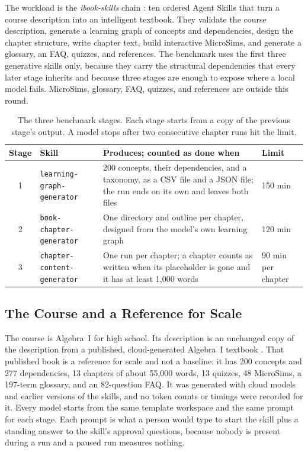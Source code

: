 \documentclass[11pt]{article}
\begin{document}
The workload is the \textit{ibook-skills} chain \cite{ibookskills}: ten ordered Agent Skills that turn a course description into an intelligent textbook. They validate the course description, generate a learning graph of concepts and dependencies, design the chapter structure, write chapter text, build interactive MicroSims, and generate a glossary, an FAQ, quizzes, and references. The benchmark uses the first three generative skills only, because they carry the structural dependencies that every later stage inherits and because three stages are enough to expose where a local model fails. MicroSims, glossary, FAQ, quizzes, and references are outside this round.

\begin{table}[htbp]
\centering
\small
\begin{tabularx}{\textwidth}{@{}clXl@{}}
\toprule
\textbf{Stage} & \textbf{Skill} & \textbf{Produces; counted as done when} & \textbf{Limit} \\
\midrule
1 & \texttt{learning-graph-generator} & 200 concepts, their dependencies, and a taxonomy, as a CSV file and a JSON file; the run ends on its own and leaves both files & 150 min \\
2 & \texttt{book-chapter-generator} & One directory and outline per chapter, designed from the model's own learning graph & 120 min \\
3 & \texttt{chapter-content-generator} & One run per chapter; a chapter counts as written when its placeholder is gone and it has at least 1,000 words & 90 min per chapter \\
\bottomrule
\end{tabularx}
\caption{The three benchmark stages. Each stage starts from a copy of the previous stage's output. A model stops after two consecutive chapter runs hit the limit.}
\label{tab:stages}
\end{table}

\subsection{The Course and a Reference for Scale}

The course is Algebra~I for high school. Its description is an unchanged copy of the description from a published, cloud-generated Algebra~I textbook \cite{algebra1}. That published book is a reference for scale and not a baseline: it has 200 concepts and 277 dependencies, 13 chapters of about 55,000 words, 13 quizzes, 48 MicroSims, a 197-term glossary, and an 82-question FAQ. It was generated with cloud models and earlier versions of the skills, and no token counts or timings were recorded for it. Every model starts from the same template workspace and the same prompt for each stage. Each prompt is what a person would type to start the skill plus a standing answer to the skill's approval questions, because nobody is present during a run and a paused run measures nothing.
\end{document}
